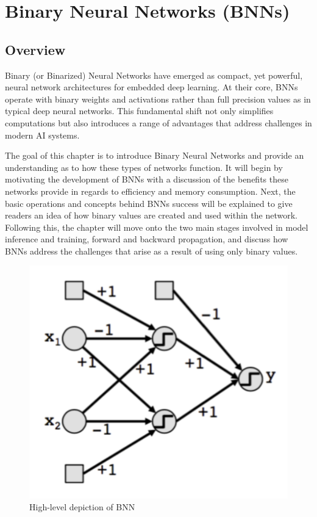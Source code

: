 \chapter{Binary Neural Networks (BNNs)}
\label{chapter:BNN}

\section{Overview}
Binary (or Binarized) Neural Networks have emerged as compact, yet powerful, neural network architectures for embedded deep learning. At their core, BNNs operate with binary weights and activations rather than full precision values as in typical deep neural networks. This fundamental shift not only simplifies computations but also introduces a range of advantages that address challenges in modern AI systems. 

The goal of this chapter is to introduce Binary Neural Networks and provide an understanding as to how these types of networks function. It will begin by motivating the development of BNNs with a discussion of the benefits these networks provide in regards to efficiency and memory consumption. Next, the basic operations and concepts behind BNNs success will be explained to give readers an idea of how binary values are created and used within the network. Following this, the chapter will move onto the two main stages involved in model inference and training, forward and backward propagation, and discuss how BNNs address the  challenges that arise as a result of using only binary values. 

\begin{figure}[htbp]
\centerline{\includegraphics[scale = .75]{images/network.png}}
\caption{High-level depiction of BNN \cite{paperExplained}}
\label{fig:network}
\end{figure}


